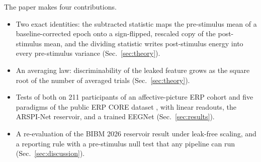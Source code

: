 The paper makes four contributions.
\begin{itemize}
\item Two exact identities: the subtracted statistic maps the pre-stimulus mean of a baseline-corrected epoch onto a sign-flipped, rescaled copy of the post-stimulus mean, and the dividing statistic writes post-stimulus energy into every pre-stimulus variance (Sec.~\ref{sec:theory}).
\item An averaging law: discriminability of the leaked feature grows as the square root of the number of averaged trials (Sec.~\ref{sec:theory}).
\item Tests of both on 211 participants of an affective-picture ERP cohort and five paradigms of the public ERP CORE dataset \cite{kappenman2021erpcore}, with linear readouts, the ARSPI-Net reservoir, and a trained EEGNet \cite{lawhern2018eegnet} (Sec.~\ref{sec:results}).
\item A re-evaluation of the BIBM 2026 reservoir result under leak-free scaling, and a reporting rule with a pre-stimulus null test that any pipeline can run (Sec.~\ref{sec:discussion}).
\end{itemize}
